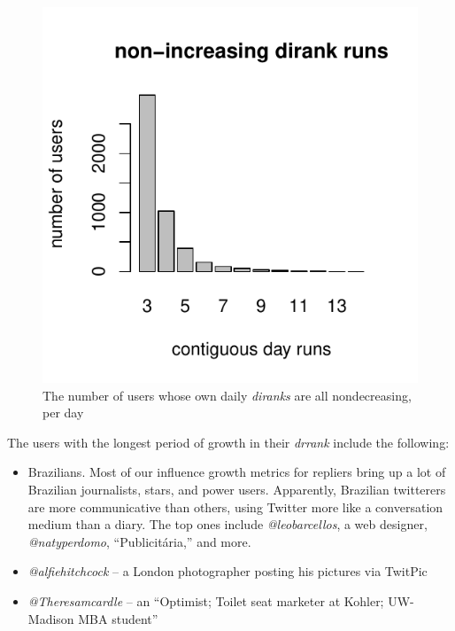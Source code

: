 \documentclass[10pt,oneside]{memoir}
\begin{document}
\begin{figure}
\begin{center}
    \includegraphics{figures/irr-hist}
    \caption{The number of users whose own daily \emph{diranks} are all nondecreasing, per day}
    \label{figure:irr-hist}
\end{center}
\end{figure}
The users with the longest period of growth in their {\itshape drrank} include the following:


\begin{itemize}


\item Brazilians.  Most of our influence growth metrics for repliers bring up a lot of Brazilian journalists, stars, and power users.  Apparently, Brazilian twitterers are more communicative than others, using Twitter more like a conversation medium than a diary.  The top ones include {\itshape @leobarcellos}, a web designer, {\itshape @natyperdomo}, ``Publicitária,'' and more.

\item {\itshape @alfiehitchcock} -- a London photographer posting his pictures via TwitPic

\item {\itshape @Theresamcardle} -- an ``Optimist; Toilet seat marketer at Kohler; UW-Madison MBA student''
\end{itemize}
\end{document}
